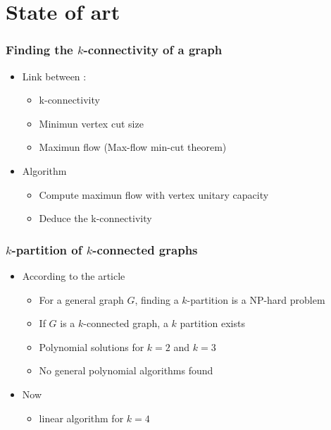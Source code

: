 \documentclass[xcolor=dvipsnames]{beamer}
\begin{document}
\section{State of art}

\begin{frame}
  \frametitle{Finding the $k$-connectivity of a graph}
  \begin{itemize}
  \item  Link between :
    \begin{itemize}
    \item k-connectivity 
    \item Minimun vertex cut size
    \item Maximun flow (Max-flow min-cut theorem)
    \end{itemize}

  \item Algorithm
    \begin{itemize}
    \item Compute maximun flow with vertex unitary capacity
    \item Deduce the k-connectivity
    \end{itemize}
  \end{itemize}

\end{frame}

\begin{frame}
  \frametitle{$k$-partition of $k$-connected graphs}
  \begin{itemize}
  \item According to the article
    \begin{itemize}
    \item For a general graph $G$, finding a $k$-partition is a NP-hard
      problem\cite{Dyer1985139}
    \item If $G$ is a $k$-connected graph, a $k$ partition exists\cite{GE78,LL77}
    \item Polynomial solutions for $k = 2$\cite{GE78,LL77} and
      $k = 3$%
    \item No general polynomial algorithms found
    \end{itemize}
  \item Now
    \begin{itemize}
    \item linear algorithm for $k = 4$\cite{Nakano1997315}
    \end{itemize}
  \end{itemize}
\end{frame}
\end{document}
